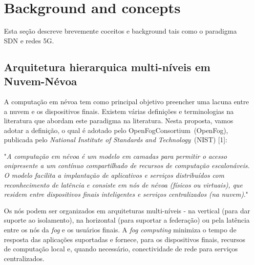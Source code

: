 \clearpage
\section{Background and concepts}
\label{ch:background}

Esta seção descreve brevemente coceitos e background tais como o paradigma SDN e redes 5G.

\subsection{Arquitetura hierarquica multi-níveis em Nuvem-Névoa}

A computação em névoa tem como principal objetivo preencher uma lacuna entre a nuvem e os dispositivos finais. Existem várias definições e terminologias na literatura que abordam este paradigma na literatura. Nesta proposta, vamos adotar a definição, o qual é adotado pelo OpenFogConsortium~(OpenFog), publicada pelo \textit{National Institute of Standards and Technology}~(NIST) [1]: 

\begin{displayquote}

"\textit{A computação em névoa é um modelo em camadas para permitir o acesso onipresente a um contínuo compartilhado de recursos de computação escalonáveis. O modelo facilita a implantação de aplicativos e serviços distribuídos com reconhecimento de latência e consiste em nós de névoa (físicos ou virtuais), que residem entre dispositivos finais inteligentes e serviços centralizados (na nuvem)}."

\end{displayquote}

Os nós podem ser organizados em arquiteturas multi-níveis - na vertical (para dar suporte ao isolamento), na horizontal (para suportar a federação) ou pela latência entre os nós da \textit{fog} e os usuários finais. A \textit{fog computing} minimiza o tempo de resposta das aplicações suportadas e fornece, para os dispositivos finais, recursos de computação local e, quando necessário, conectividade de rede para serviços centralizados. %

